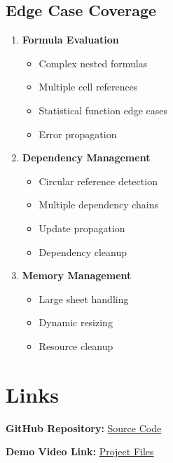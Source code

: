 \documentclass{article}
\begin{document}
\subsection{Edge Case Coverage}
\begin{enumerate}
    \item \textbf{Formula Evaluation}
    \begin{itemize}
        \item Complex nested formulas
        \item Multiple cell references
        \item Statistical function edge cases
        \item Error propagation
    \end{itemize}

    \item \textbf{Dependency Management}
    \begin{itemize}
        \item Circular reference detection
        \item Multiple dependency chains
        \item Update propagation
        \item Dependency cleanup
    \end{itemize}

    \item \textbf{Memory Management}
    \begin{itemize}
        \item Large sheet handling
        \item Dynamic resizing
        \item Resource cleanup
    \end{itemize}
\end{enumerate}

\section{Links}

\noindent\textbf{GitHub Repository:} \href{https://github.com/sanchit324/COP290_Excel_C.git}{Source Code}

\noindent\textbf{Demo Video Link:} \href{https://drive.google.com/file/d/1oWACy251w843R7UWRenzGT0L79_Z1Bqw/view?usp=sharing}{Project Files}
\end{document}

